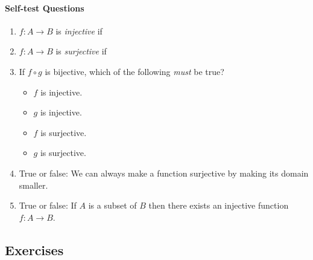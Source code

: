 \paragraph{Self-test Questions}

	\begin{enumerate}
    \item $f:A\to B$ is \emph{injective} if \underline{\phantom{$f(a_1)=f(a_2)\implies a_1=a_2$\qquad\qquad}}
    \item $f:A\to B$ is \emph{surjective} if \underline{\phantom{$\forall b\in B,\exists a\in A:f(a)=b$\qquad\qquad}}
    \item If $f\circ g$ is bijective, which of the following \emph{must} be true?
    \begin{itemize}
      \item $f$ is injective.
      \item $g$ is injective.
      \item $f$ is surjective. 
      \item $g$ is surjective.
    \end{itemize}
    \item True or false: We can always make a function surjective by making its domain smaller.
    \item True or false: If $A$ is a subset of $B$ then there exists an injective function $f:A\to B$.
  \end{enumerate}

\subsection*{Exercises}

